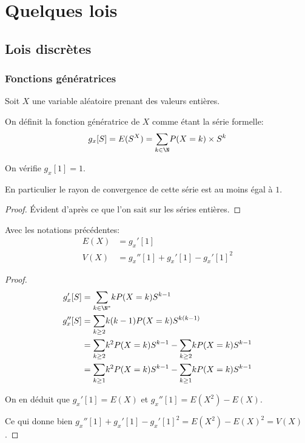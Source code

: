 \section{Quelques lois}

\subsection{Lois discrètes}

\subsubsection{Fonctions génératrices}

\begin{de}
Soit $X$ une variable aléatoire prenant des valeurs entières.

On définit la fonction génératrice de $X$ comme étant la série formelle:
\[
g_x[S] = E(S^X) = \displaystyle{\sum \limits_{k \in \N}} P(X=k) \times S^k
\]

On vérifie $g_x[1] = 1$.

En particulier le rayon de convergence de cette série est au moins égal à $1$.
\end{de}

\begin{proof}
Évident d'après ce que l'on sait sur les séries entières.
\end{proof}

\begin{prop}
Avec les notations précédentes:
\begin{align*}
E(X) & = g_x'[1] \\
V(X) & = g_x''[1] + g_x'[1] - g_x'[1]^2
\end{align*}

\end{prop}


\begin{proof}
\begin{align*}
g_x'[S] & =  \displaystyle{\sum \limits_{k \in \N^{*}}} k P(X=k) S^{k-1} \\
g_x''[S] & = \displaystyle{\sum \limits_{k \geq 2}} k(k-1) P(X=k) S^{k(k-1)} \\
 & = \displaystyle{\sum \limits_{k \geq 2}} k^2 P(X=k) S^{k-1} - \displaystyle{\sum \limits_{k \geq 2}} k P(X=k) S^{k-1} \\
 & = \displaystyle{\sum \limits_{k \geq 1}} k^2 P(X=k) S^{k-1} - \displaystyle{\sum \limits_{k \geq 1}} k P(X=k) S^{k-1} 
\end{align*}

On en déduit que $g_x'[1] = E(X)$ et $g_x''[1]=E(X^2)-E(X)$.

Ce qui donne bien $g_x''[1] + g_x'[1] - g_x'[1]^2 = E(X^2)-E(X)^2 = V(X)$.
\end{proof}

